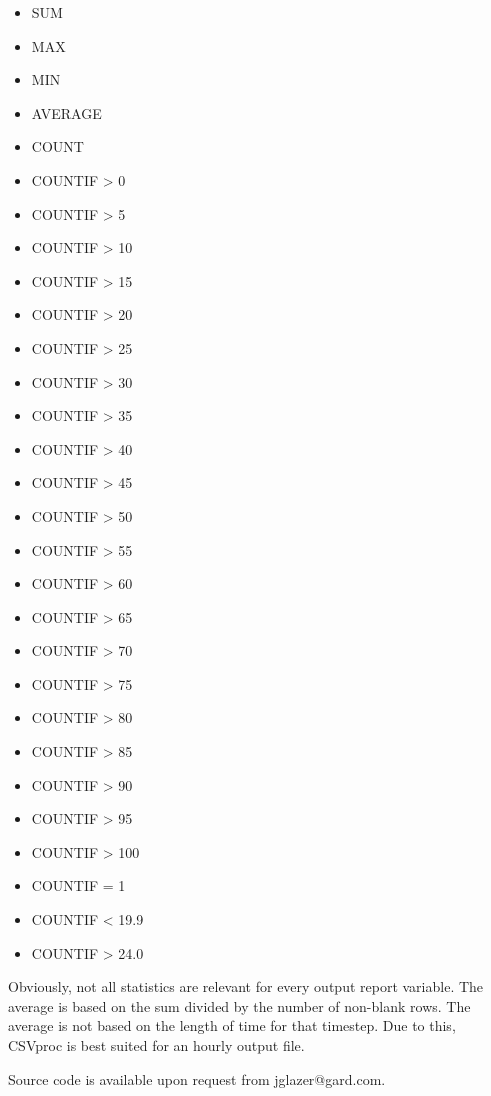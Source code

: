 \begin{itemize}
\item
  SUM
\item
  MAX
\item
  MIN
\item
  AVERAGE
\item
  COUNT
\item
  COUNTIF \textgreater{} 0
\item
  COUNTIF \textgreater{} 5
\item
  COUNTIF \textgreater{} 10
\item
  COUNTIF \textgreater{} 15
\item
  COUNTIF \textgreater{} 20
\item
  COUNTIF \textgreater{} 25
\item
  COUNTIF \textgreater{} 30
\item
  COUNTIF \textgreater{} 35
\item
  COUNTIF \textgreater{} 40
\item
  COUNTIF \textgreater{} 45
\item
  COUNTIF \textgreater{} 50
\item
  COUNTIF \textgreater{} 55
\item
  COUNTIF \textgreater{} 60
\item
  COUNTIF \textgreater{} 65
\item
  COUNTIF \textgreater{} 70
\item
  COUNTIF \textgreater{} 75
\item
  COUNTIF \textgreater{} 80
\item
  COUNTIF \textgreater{} 85
\item
  COUNTIF \textgreater{} 90
\item
  COUNTIF \textgreater{} 95
\item
  COUNTIF \textgreater{} 100
\item
  COUNTIF = 1
\item
  COUNTIF \textless{} 19.9
\item
  COUNTIF \textgreater{} 24.0
\end{itemize}

Obviously, not all statistics are relevant for every output report variable. The average is based on the sum divided by the number of non-blank rows. The average is not based on the length of time for that timestep. Due to this, CSVproc is best suited for an hourly output file.

Source code is available upon request from jglazer@gard.com.
